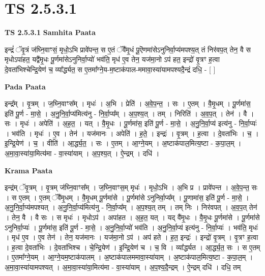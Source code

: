 \documentclass[17pt]{extarticle}
\begin{document}
\section*{ TS 2.5.3.1 }

\textbf{TS 2.5.3.1 } \newline
\textbf{Samhita Paata} \newline

इन्द्रं॑ ॅवृ॒त्रं ज॑घ्नि॒वाꣳसं॒ मृधो॒ऽभि प्रावे॑पन्त॒ स ए॒तं ॅवै॑मृ॒धं पू॒ऎणमा॑सेऽनुनिर्वा॒प्य॑मपश्य॒त् तं निर॑वप॒त् तेन॒ वै स मृधोऽपा॑हत॒ यद्वै॑मृ॒धः पू॒र्णमा॑सेऽनुनिर्वा॒प्यो॑ भव॑ति॒ मृध॑ ए॒व तेन॒ यज॑मा॒नो ऽप॑ हत॒ इन्द्रो॑ वृ॒त्रꣳ ह॒त्वा दे॒वता॑भिश्चेन्द्रि॒येण॑ च॒ व्या᳚र्द्ध्यत॒ स ए॒तमा᳚ग्ने॒य-म॒ष्टाक॑पाल-ममावा॒स्या॑यामपश्यदै॒न्द्रं दधि॒ - [  ] \newline

\textbf{Pada Paata} \newline

इन्द्र᳚म् । वृ॒त्रम् । ज॒घ्नि॒वाꣳस᳚म् । मृधः॑ । अ॒भि । प्रेति॑ । अ॒वे॒प॒न्त॒ । सः । ए॒तम् । वै॒मृ॒धम् । पू॒र्णमा॑स॒ इति॑ पू॒र्ण - मा॒से॒ । अ॒नु॒नि॒र्वा॒प्य॑मित्य॑नु - नि॒र्वा॒प्य᳚म् । अ॒प॒श्य॒त् । तम् । निरिति॑ । अ॒व॒प॒त् । तेन॑ । वै । सः । मृधः॑ । अपेति॑ । अ॒ह॒त॒ । यत् । वै॒मृ॒धः । पू॒र्णमा॑स॒ इति॑ पू॒र्ण - मा॒से॒ । अ॒नु॒नि॒र्वा॒प्य॑ इत्य॑नु - नि॒र्वा॒प्यः॑ । भव॑ति । मृधः॑ । ए॒व । तेन॑ । यज॑मानः । अपेति॑ । ह॒ते॒ । इन्द्रः॑ । वृ॒त्रम् । ह॒त्वा । दे॒वता॑भिः । च॒ । इ॒न्द्रि॒येण॑ । च॒ । वीति॑ । आ॒र्द्ध्य॒त॒ । सः । ए॒तम् । आ॒ग्ने॒यम् । अ॒ष्टाक॑पाल॒मित्य॒ष्टा - क॒पा॒ल॒म् । अ॒मा॒वा॒स्या॑या॒मित्य॑मा - वा॒स्या॑याम् । अ॒प॒श्य॒त् । ऐ॒न्द्रम् । दधि॑ ।  \newline


\textbf{Krama Paata} \newline

इन्द्र॑म् ॅवृ॒त्रम् । वृ॒त्रम् ज॑घ्नि॒वाꣳस᳚म् । ज॒घ्नि॒वाꣳस॒म् मृधः॑ । मृधो॒ऽभि । अ॒भि प्र । प्रावे॑पन्त । अ॒वे॒प॒न्त॒ सः । स ए॒तम् । ए॒तम् ॅवै॑मृ॒धम् । वै॒मृ॒धम् पू॒र्णमा॑से । पू॒र्णमा॑से ऽनुनिर्वा॒प्य᳚म् । पू॒णामा॑स॒ इति॑ पू॒र्ण - मा॒से॒ । अ॒नु॒नि॒र्वा॒प्य॑मपश्यत् । अ॒नु॒नि॒र्वा॒प्य॑मित्य॑नु - नि॒र्वा॒प्य᳚म् । अ॒प॒श्य॒त् तम् । तम् निः । निर॑वपत् । अ॒व॒प॒त् तेन॑ । तेन॒ वै । वै सः । स मृधः॑ । मृधोऽप॑ । अपा॑हत । अ॒ह॒त॒ यत् । यद् वै॑मृ॒धः । वै॒मृ॒धः पू॒र्णमा॑से । पू॒र्णमा॑से ऽनुनिर्वा॒प्यः॑ । पू॒र्णमा॑स॒ इति॑ पू॒र्ण - मा॒से॒ । अ॒नु॒नि॒र्वा॒प्यो॑ भव॑ति । अ॒नु॒नि॒र्वा॒प्य॑ इत्य॑नु - नि॒र्वा॒प्यः॑ । भव॑ति॒ मृधः॑ । मृध॑ ए॒व । ए॒व तेन॑ । तेन॒ यज॑मानः । यज॑मा॒नो ऽप॑ । अप॑ हते । ह॒त॒ इन्द्रः॑ । इन्द्रो॑ वृ॒त्रम् । वृ॒त्रꣳ ह॒त्वा । ह॒त्वा दे॒वता॑भिः । दे॒वता॑भिश्च । चे॒न्द्रि॒येण॑ । इ॒न्द्रि॒येण॑ च । च॒ वि । व्या᳚र्द्ध्यत । आ॒र्द्ध्य॒त॒ सः । स ए॒तम् । ए॒तमा᳚ग्ने॒यम् । आ॒ग्ने॒यम॒ष्टाक॑पालम् । अ॒ष्टाक॑पालममावा॒स्या॑याम् । अ॒ष्टाक॑पाल॒मित्य॒ष्टा - क॒पा॒ल॒म् । अ॒मा॒वा॒स्या॑यामपश्यत् । अ॒मा॒वा॒स्या॑या॒मित्य॑मा - वा॒स्या॑याम् । अ॒प॒श्य॒दै॒न्द्रम् । ऐ॒न्द्रम् दधि॑ । दधि॒ तम् \newline
\end{document}
